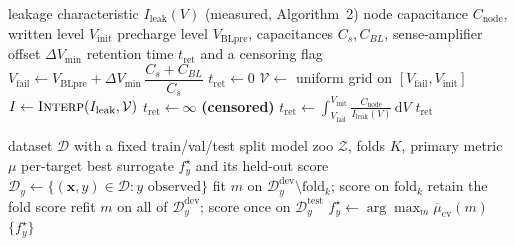 \begin{algorithm}[!t]
\caption{Quasi-static retention time from measured leakage}
\label{alg:quasi_static_retention_time_from_measured_leakage}
\begin{algorithmic}[1]
\Require leakage characteristic $I_{\mathrm{leak}}(V)$ (measured, Algorithm~2)
\Require node capacitance $C_{\mathrm{node}}$, written level $V_{\mathrm{init}}$
\Require precharge level $V_{\mathrm{BLpre}}$, capacitances $C_s, C_{BL}$, sense-amplifier offset $\Delta V_{\min}$
\Ensure retention time $t_{\mathrm{ret}}$ and a censoring flag
    \State $V_{\mathrm{fail}} \leftarrow V_{\mathrm{BLpre}} + \Delta V_{\min}\,\dfrac{C_s+C_{BL}}{C_s}$
        \Return $t_{\mathrm{ret}} \leftarrow 0$
    \EndIf
    \State $\mathcal{V} \leftarrow$ uniform grid on $[V_{\mathrm{fail}}, V_{\mathrm{init}}]$
    \State $I \leftarrow \textsc{Interp}(I_{\mathrm{leak}}, \mathcal{V})$
        \Return $t_{\mathrm{ret}} \leftarrow \infty$ \textbf{(censored)}
    \EndIf
    \State $t_{\mathrm{ret}} \leftarrow \displaystyle\int_{V_{\mathrm{fail}}}^{V_{\mathrm{init}}} \frac{C_{\mathrm{node}}}{I_{\mathrm{leak}}(V)}\,\mathrm{d}V$
    \Return $t_{\mathrm{ret}}$
\end{algorithmic}
\end{algorithm}


\begin{algorithm}[!t]
\caption{Cross-validated surrogate selection}
\label{alg:cross_validated_surrogate_selection}
\begin{algorithmic}[1]
\Require dataset $\mathcal{D}$ with a fixed train/val/test split
\Require model zoo $\mathcal{Z}$, folds $K$, primary metric $\mu$
\Ensure per-target best surrogate $f^\star_y$ and its held-out score
        \State $\mathcal{D}_y \leftarrow \{(\mathbf{x},y) \in \mathcal{D} : y \text{ observed}\}$
                \State fit $m$ on $\mathcal{D}_y^{\mathrm{dev}}\setminus \mathrm{fold}_k$; score on $\mathrm{fold}_k$
                \State retain the fold score
            \EndFor
            \State refit $m$ on all of $\mathcal{D}_y^{\mathrm{dev}}$; score once on $\mathcal{D}_y^{\mathrm{test}}$
        \EndFor
        \State $f^\star_y \leftarrow \arg\max_m \overline{\mu}_{\mathrm{cv}}(m)$
    \EndFor
    \Return $\{f^\star_y\}$
\end{algorithmic}
\end{algorithm}


